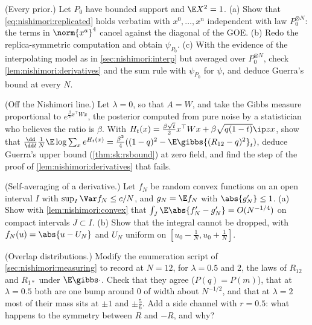 \begin{refsection}
\begin{exercises}
\item \byhand (Every prior.) Let $P_0$ have bounded support and $\E X^2=1$. (a) Show that \eqref{eq:nishimori:replicated} holds verbatim with $x^0,\dots,x^n$ independent with law $P_0^{\otimes N}$: the terms in $\norm{x^a}^4$ cancel against the diagonal of the GOE. (b) Redo the replica-symmetric computation and obtain $\psi_{P_0}$. (c) With the evidence of the interpolating model as in \cref{sec:nishimori:interp} but averaged over $P_0^{\otimes N}$, check \cref{lem:nishimori:derivatives} and the sum rule with $\psi_{P_0}$ for $\psi$, and deduce Guerra's bound at every $N$.\label{ex:nishimori:general}

\item \translate (Off the Nishimori line.) Let $\lambda=0$, so that $A=W$, and take the Gibbs measure proportional to $e^{\frac\beta2x^\top Wx}$, the posterior computed from pure noise by a statistician who believes the ratio is $\beta$. With $H_t(x)=\frac{\beta\sqrt t}2x^\top Wx+\beta\sqrt{q(1-t)}\ip zx$, show that $\frac{\dd}{\dd t}\frac1N\E\log\sum_xe^{H_t(x)}=\frac{\beta^2}4((1-q)^2-\E\gibbs{(R_{12}-q)^2}_t)$, deduce Guerra's upper bound (\cref{thm:sk:rsbound}) at zero field, and find the step of the proof of \cref{lem:nishimori:derivatives} that fails.\label{ex:nishimori:sk}

\item \translate (Self-averaging of a derivative.) Let $f_N$ be random convex functions on an open interval $I$ with $\sup_I\Var f_N\le c/N$, and $g_N=\E f_N$ with $\abs{g_N'}\le1$. (a) Show with \cref{lem:nishimori:convex} that $\int_J\E\abs{f_N'-g_N'}=O(N^{-1/4})$ on compact intervals $J\subset I$. (b) Show that the integral cannot be dropped, with $f_N(u)=\abs{u-U_N}$ and $U_N$ uniform on $[u_0-\frac1N,u_0+\frac1N]$.\label{ex:nishimori:selfavg}

\item \measurement (Overlap distributions.) Modify the enumeration script of \cref{sec:nishimori:measuring} to record at $N=12$, for $\lambda=0.5$ and $2$, the laws of $R_{12}$ and $R_{1*}$ under $\E\gibbs\cdot$. Check that they agree ($P(q)=P(m)$), that at $\lambda=0.5$ both are one bump around $0$ of width about $N^{-1/2}$, and that at $\lambda=2$ most of their mass sits at $\pm1$ and $\pm\frac56$. Add a side channel with $r=0.5$: what happens to the symmetry between $R$ and $-R$, and why?\label{ex:nishimori:histograms}


\end{exercises}
\end{refsection}
